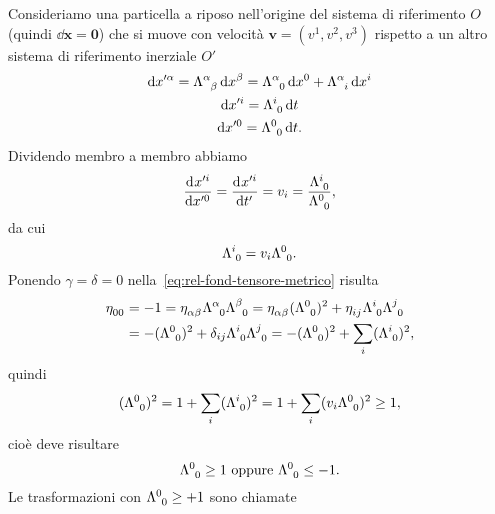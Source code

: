 Consideriamo una particella a riposo nell'origine del sistema di riferimento $O$
(quindi $\dd \bm{x} = \bm{0}$) che si muove con velocità
$\bm{v} = (v^{1},v^{2},v^{3})$ rispetto a un altro sistema di riferimento
inerziale $O'$
\begin{gather}
  \dd x'^{\alpha} = \tensor{\Lambda}{^{\alpha}_{\beta}} \dd x^{\beta} =
  \tensor{\Lambda}{^{\alpha}_{0}} \dd x^{0} + \tensor{\Lambda}{^{\alpha}_{i}}\dd
  x^{i} \\
  \dd x'^{i} = \tensor{\Lambda}{^{i}_{0}}\dd t \\
  \dd x'^{0} = \tensor{\Lambda}{^{0}_{0}}\dd t.
\end{gather}
Dividendo membro a membro abbiamo
\begin{equation}
  \toder{x'^{i}}{x'^{0}} = \toder{x'^{i}}{t'} = v_{i} =
  \frac{\tensor{\Lambda}{^{i}_{0}}}{\tensor{\Lambda}{^{0}_{0}}},
\end{equation}
da cui
\begin{equation}
  \tensor{\Lambda}{^{i}_{0}} = v_{i}\tensor{\Lambda}{^{0}_{0}}.
\end{equation}
Ponendo $\gamma = \delta = 0$ nella~\eqref{eq:rel-fond-tensore-metrico} risulta
\begin{equation}
  \begin{split}
    \tensor{\eta}{_{00}} &= -1 = \tensor{\eta}{_{\alpha\beta}}
    \tensor{\Lambda}{^{\alpha}_{0}} \tensor{\Lambda}{^{\beta}_{0}} =
    \tensor{\eta}{_{\alpha\beta}}(\tensor{\Lambda}{^{0}_{0}})^{2} +
    \tensor{\eta}{_{ij}} \tensor{\Lambda}{^{i}_{0}} \tensor{\Lambda}{^{j}_{0}}
    \\
    &= -(\tensor{\Lambda}{^{0}_{0}})^{2} + \delta_{ij}
    \tensor{\Lambda}{^{i}_{0}} \tensor{\Lambda}{^{j}_{0}} =
    -(\tensor{\Lambda}{^{0}_{0}})^{2} + \sum_{i}(\tensor{\Lambda}{^{i}_{0}})^{2},
  \end{split}
\end{equation}
quindi
\begin{equation}
  (\tensor{\Lambda}{^{0}_{0}})^{2} = 1 +
  \sum_{i}(\tensor{\Lambda}{^{i}_{0}})^{2} = 1 +
  \sum_{i}(v_{i}\tensor{\Lambda}{^{0}_{0}})^{2} \geq 1,
\end{equation}
cioè deve risultare
\begin{equation}
  \tensor{\Lambda}{^{0}_{0}} \geq 1 \text{ oppure } \tensor{\Lambda}{^{0}_{0}}
  \leq -1.
\end{equation}
Le trasformazioni con $\tensor{\Lambda}{^{0}_{0}} \geq +1$ sono chiamate
